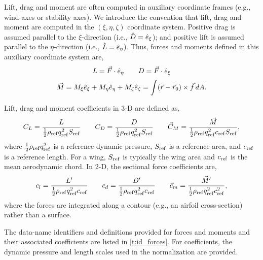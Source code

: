 Lift, drag and moment are often computed in auxiliary coordinate frames
(e.g., wind axes or stability axes).  We introduce the convention that
lift, drag and moment are computed in the $(\xi,\eta,\zeta)$ coordinate
system.  Positive drag is assumed parallel to the $\xi$-direction (i.e.,
${\hat{D}} = {{\hat{e}}_\xi}$); and positive lift is assumed parallel to the
$\eta$-direction (i.e., ${\hat{L}} = {{\hat{e}}_\eta}$).  Thus, forces and
moments defined in this auxiliary coordinate system are,
$$
 L = {\vec{F}} \cdot {{\hat{e}}_\eta}  \qquad  D = {\vec{F}} \cdot {{\hat{e}}_\xi} 
$$
$$
 {\vec{M}} = M_\xi {{\hat{e}}_\xi} + M_\eta {{\hat{e}}_\eta} + M_\zeta {{\hat{e}}_\zeta} 
       = \int ({\vec{r}} - {\vec{r}}_0) \times {\vec{f}} \,dA.
$$

Lift, drag and moment coefficients in 3-D are defined as,
$$
 C_L = {L \over {1\over2} \rho_{\rm ref} q_{\rm ref}^2 S_{\rm ref}}  \qquad
 C_D = {D \over {1\over2} \rho_{\rm ref} q_{\rm ref}^2 S_{\rm ref}}  \qquad
 {\vec{C}}_M = {{\vec{M}} \over {1\over2} \rho_{\rm ref} q_{\rm ref}^2 c_{\rm ref} S_{\rm ref}}, 
$$
where ${1\over2} \rho_{\rm ref} q_{\rm ref}^2$ is a reference dynamic pressure,
$S_{\rm ref}$ is a reference area, and $c_{\rm ref}$ is a reference length.
For a wing, $S_{\rm ref}$ is typically the wing area and $c_{\rm ref}$ is the
mean aerodynamic chord.
In 2-D, the sectional force coefficients are,
$$
 c_l = {L' \over {1\over2} \rho_{\rm ref} q_{\rm ref}^2 c_{\rm ref}}  \qquad
 c_d = {D' \over {1\over2} \rho_{\rm ref} q_{\rm ref}^2 c_{\rm ref}}  \qquad
 {\vec{c}}_m = {{\vec{M}}' \over {1\over2} \rho_{\rm ref} q_{\rm ref}^2 c_{\rm ref}^2}, 
$$
where the forces are integrated along a contour (e.g., an airfoil
cross-section) rather than a surface.

The data-name identifiers and definitions provided for forces
and moments and their associated coefficients are listed in
\autoref{t:id_forces}.
For coefficients, the dynamic pressure and length scales used in the
normalization are provided.

